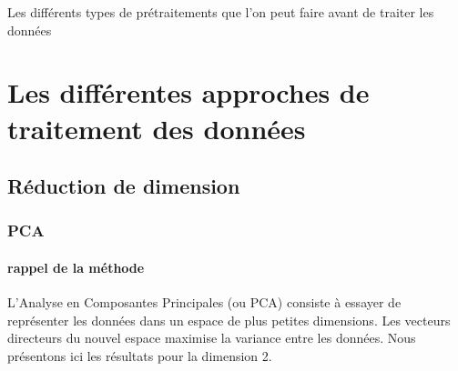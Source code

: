 \documentclass[a4paper,10pt]{report}
\begin{document}
Les différents types de prétraitements que l'on peut faire avant de traiter les données
\section{Les différentes approches de traitement des données}

\subsection{Réduction de dimension}
\subsubsection{PCA}
\paragraph{rappel de la méthode }
L'Analyse en Composantes Principales (ou PCA) consiste à essayer de représenter les données dans un espace de plus petites dimensions. Les vecteurs directeurs du nouvel espace maximise la variance entre les données. Nous présentons ici les résultats pour la dimension 2.
\end{document}
